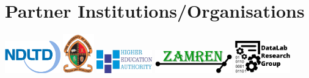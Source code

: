 \section{Partner Institutions/Organisations}

\begin{center}
\includegraphics[width=0.18\textwidth]{images/logos/Partnerlogos/img-etd2024-ndltd_logo.png}
\includegraphics[width=0.10\textwidth]{images/logos/Partnerlogos/img-etd2024-unza_logo.png}
\includegraphics[width=0.18\textwidth]{images/logos/Partnerlogos/img-etd2024-hea_logo.png}
\includegraphics[width=0.25\textwidth]{images/logos/Partnerlogos/img-etd2024-zamren_logo.png}
\includegraphics[width=0.18\textwidth]{images/logos/Partnerlogos/img-etd24-artwork-sponsors-datalab.png}
\end{center}


